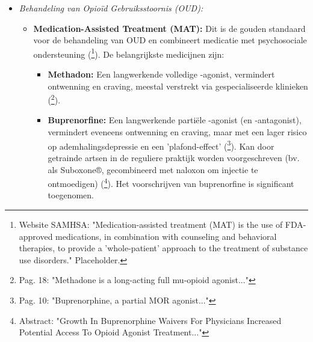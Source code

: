 \documentclass[11pt, a4paper]{report} %
\begin{document}
\begin{itemize}
\begin{itemize}
\begin{itemize}
                    \item Opzetten van Gebruiksruimten (Supervised Consumption Sites): Medisch gesuperviseerde locaties waar mensen hun eigen drugs op een hygiënische en veilige manier kunnen gebruiken, met direct toegang tot hulp bij overdosis en doorverwijzing naar zorg (\cite{CSC_EffectivenessReview}\footnote{Review van effectiveness van CSCs: "Supervised consumption services (SCS) are associated with reductions in overdose mortality..." Placeholder voor een specifieke review hierover.}). Deze zijn controversieel maar hebben in landen waar ze bestaan bewezen effectief te zijn in het verminderen van overdoses en infectieziekten.
                \end{itemize}
            \item \textit{Behandeling van Opioïd Gebruiksstoornis (OUD):}
                \begin{itemize}
                    \item \textbf{Medication-Assisted Treatment (MAT):} Dit is de gouden standaard voor de behandeling van OUD en combineert medicatie met psychosociale ondersteuning (\cite{SAMHSA_MAT_Page}\footnote{Website SAMHSA: "Medication-assisted treatment (MAT) is the use of FDA-approved medications, in combination with counseling and behavioral therapies, to provide a 'whole-patient' approach to the treatment of substance use disorders." Placeholder.}). De belangrijkste medicijnen zijn:
                        \begin{itemize}
                            \item \textbf{Methadon:} Een langwerkende volledige \textmu-agonist, vermindert ontwenning en craving, meestal verstrekt via gespecialiseerde klinieken (\cite{Kosten2002NeurobiologyDependence}\footnote{Pag. 18: "Methadone is a long-acting full mu-opioid agonist..."}).
                            \item \textbf{Buprenorfine:} Een langwerkende partiële \textmu-agonist (en \textkappa-antagonist), vermindert eveneens ontwenning en craving, maar met een lager risico op ademhalingsdepressie en een 'plafond-effect' (\cite{Feng2023MLOpioidInteractome}\footnote{Pag. 10: "Buprenorphine, a partial MOR agonist..."}). Kan door getrainde artsen in de reguliere praktijk worden voorgeschreven (bv. als Suboxone®, gecombineerd met naloxon om injectie te ontmoedigen) (\cite{Jones2015BuprenorphineWaivers}\footnote{Abstract: "Growth In Buprenorphine Waivers For Physicians Increased Potential Access To Opioid Agonist Treatment..."}). Het voorschrijven van buprenorfine is significant toegenomen.

\end{itemize}
\end{itemize}
\end{itemize}
\end{itemize}
\end{document}
